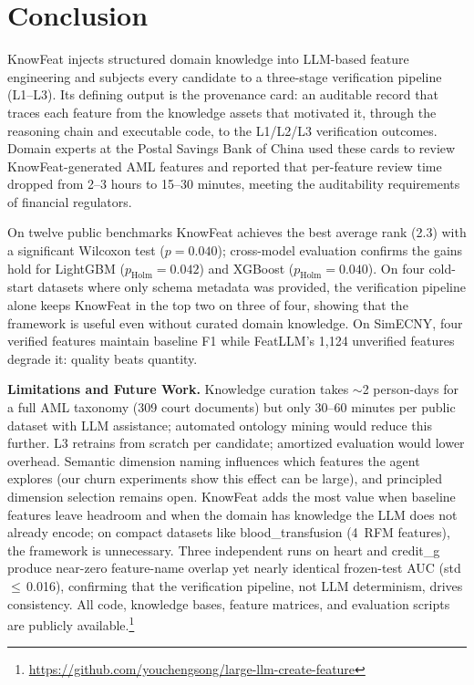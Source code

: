 \section{Conclusion}
\label{sec:conclusion}

KnowFeat injects structured domain knowledge into LLM-based feature engineering and subjects every candidate to a three-stage verification pipeline (L1--L3). Its defining output is the provenance card: an auditable record that traces each feature from the knowledge assets that motivated it, through the reasoning chain and executable code, to the L1/L2/L3 verification outcomes. Domain experts at the Postal Savings Bank of China used these cards to review KnowFeat-generated AML features and reported that per-feature review time dropped from 2--3 hours to 15--30 minutes, meeting the auditability requirements of financial regulators.

On twelve public benchmarks KnowFeat achieves the best average rank (2.3) with a significant Wilcoxon test ($p{=}0.040$); cross-model evaluation confirms the gains hold for LightGBM ($p_{\mathrm{Holm}}{=}0.042$) and XGBoost ($p_{\mathrm{Holm}}{=}0.040$). On four cold-start datasets where only schema metadata was provided, the verification pipeline alone keeps KnowFeat in the top two on three of four, showing that the framework is useful even without curated domain knowledge. On SimECNY, four verified features maintain baseline F1 while FeatLLM's 1{,}124 unverified features degrade it: quality beats quantity.

\textbf{Limitations and Future Work.}
Knowledge curation takes $\sim$2 person-days for a full AML taxonomy (309 court documents) but only 30--60 minutes per public dataset with LLM assistance; automated ontology mining would reduce this further.
L3 retrains from scratch per candidate; amortized evaluation would lower overhead.
Semantic dimension naming influences which features the agent explores (our churn experiments show this effect can be large), and principled dimension selection remains open.
KnowFeat adds the most value when baseline features leave headroom and when the domain has knowledge the LLM does not already encode; on compact datasets like blood\_transfusion (4~RFM features), the framework is unnecessary.
Three independent runs on heart and credit\_g produce near-zero feature-name overlap yet nearly identical frozen-test AUC (std\,$\leq$\,0.016), confirming that the verification pipeline, not LLM determinism, drives consistency.
All code, knowledge bases, feature matrices, and evaluation scripts are publicly available.\footnote{\url{https://github.com/youchengsong/large-llm-create-feature}}
